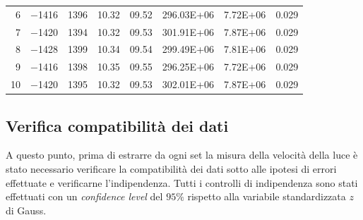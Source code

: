 \documentclass[a4paper,11pt]{article}
\begin{document}
\begin{table}[htbp]
\begin{tabular}{rllllllr}
			\rowcolor[rgb]{ .741,  .843,  .933} 6     & \cellcolor[rgb]{ .929,  .929,  .929} \num{-1416} & \cellcolor[rgb]{ .929,  .929,  .929} \num{1396} & \cellcolor[rgb]{ .929,  .929,  .929} \num{10.32} & \cellcolor[rgb]{ .929,  .929,  .929} \num{09.52} & \cellcolor[rgb]{ .929,  .929,  .929} \num{296.03E+06} & \cellcolor[rgb]{ .929,  .929,  .929} \num{7.72E+06} & \cellcolor[rgb]{ .929,  .929,  .929} 0.029 \\
			\rowcolor[rgb]{ .741,  .843,  .933} 7     & \cellcolor[rgb]{ .859,  .859,  .859} \num{-1420} & \cellcolor[rgb]{ .859,  .859,  .859} \num{1394} & \cellcolor[rgb]{ .859,  .859,  .859} \num{10.32} & \cellcolor[rgb]{ .859,  .859,  .859} \num{09.53} & \cellcolor[rgb]{ .859,  .859,  .859} \num{301.91E+06} & \cellcolor[rgb]{ .859,  .859,  .859} \num{7.87E+06} & \cellcolor[rgb]{ .859,  .859,  .859} 0.029 \\
			\rowcolor[rgb]{ .741,  .843,  .933} 8     & \cellcolor[rgb]{ .929,  .929,  .929} \num{-1428} & \cellcolor[rgb]{ .929,  .929,  .929} \num{1399} & \cellcolor[rgb]{ .929,  .929,  .929} \num{10.34} & \cellcolor[rgb]{ .929,  .929,  .929} \num{09.54} & \cellcolor[rgb]{ .929,  .929,  .929} \num{299.49E+06} & \cellcolor[rgb]{ .929,  .929,  .929} \num{7.81E+06} & \cellcolor[rgb]{ .929,  .929,  .929} 0.029 \\
			\rowcolor[rgb]{ .741,  .843,  .933} 9     & \cellcolor[rgb]{ .859,  .859,  .859} \num{-1416} & \cellcolor[rgb]{ .859,  .859,  .859} \num{1398} & \cellcolor[rgb]{ .859,  .859,  .859} \num{10.35} & \cellcolor[rgb]{ .859,  .859,  .859} \num{09.55} & \cellcolor[rgb]{ .859,  .859,  .859} \num{296.25E+06} & \cellcolor[rgb]{ .859,  .859,  .859} \num{7.72E+06} & \cellcolor[rgb]{ .859,  .859,  .859} 0.029 \\
			\rowcolor[rgb]{ .741,  .843,  .933} 10    & \cellcolor[rgb]{ .929,  .929,  .929} \num{-1420} & \cellcolor[rgb]{ .929,  .929,  .929} \num{1395} & \cellcolor[rgb]{ .929,  .929,  .929} \num{10.32} & \cellcolor[rgb]{ .929,  .929,  .929} \num{09.53} & \cellcolor[rgb]{ .929,  .929,  .929} \num{302.01E+06} & \cellcolor[rgb]{ .929,  .929,  .929} \num{7.87E+06} & \cellcolor[rgb]{ .929,  .929,  .929} 0.029 \\
		\end{tabular}%
		\label{tab:couterclockclockdata}%
	\end{table}%
	\newpage
	\subsection{Verifica compatibilità dei dati}
	A questo punto, prima di estrarre da ogni set la misura della velocità della luce è stato necessario verificare la compatibilità dei dati sotto alle ipotesi di errori effettuate e verificarne l'indipendenza. Tutti i controlli di indipendenza sono stati effettuati con un \emph{confidence level} del $ 95\% $ rispetto alla variabile standardizzata $ z $ di Gauss. 
	
\end{document}
